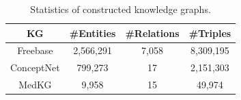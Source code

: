 \begin{table}[H]
    \centering
    \caption{Statistics of constructed knowledge graphs.}
    \label{tab:kg}
    \begin{tabular}{@{}cccc@{}}
        \toprule
        KG         & \#Entities & \#Relations & \#Triples \\\midrule
        Freebase   & 2,566,291
                   & 7,058      & 8,309,195               \\
        ConceptNet & 799,273    & 17           & 2,151,303   \\
        MedKG      & 9,958 & 15 & 49,974  \\

        \bottomrule
    \end{tabular}%
\end{table}